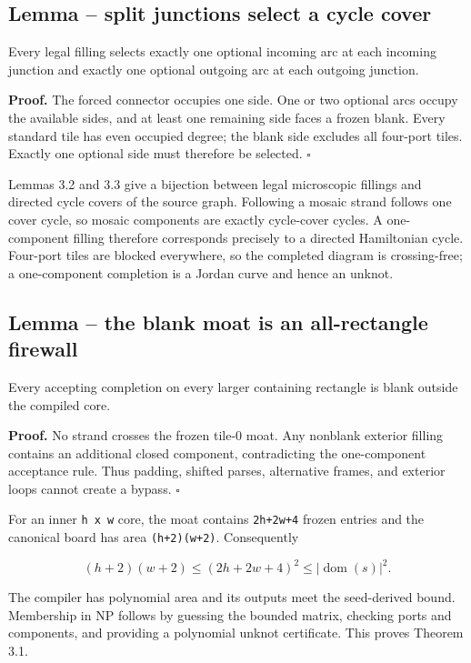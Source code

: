 \documentclass[11pt]{article}
\begin{document}
\subsection{Lemma -- split junctions select a cycle cover}

Every legal filling selects exactly one optional incoming arc at each incoming
junction and exactly one optional outgoing arc at each outgoing junction.

\textbf{Proof.}  The forced connector occupies one side.  One or two optional arcs
occupy the available sides, and at least one remaining side faces a frozen
blank.  Every standard tile has even occupied degree; the blank side excludes
all four-port tiles.  Exactly one optional side must therefore be selected. \hfill$\square$

Lemmas 3.2 and 3.3 give a bijection between legal microscopic fillings and
directed cycle covers of the source graph.  Following a mosaic strand follows
one cover cycle, so mosaic components are exactly cycle-cover cycles.  A
one-component filling therefore corresponds precisely to a directed
Hamiltonian cycle.  Four-port tiles are blocked everywhere, so the completed
diagram is crossing-free; a one-component completion is a Jordan curve and
hence an unknot.

\subsection{Lemma -- the blank moat is an all-rectangle firewall}

Every accepting completion on every larger containing rectangle is blank
outside the compiled core.

\textbf{Proof.}  No strand crosses the frozen tile-0 moat.  Any nonblank exterior
filling contains an additional closed component, contradicting the
one-component acceptance rule.  Thus padding, shifted parses, alternative
frames, and exterior loops cannot create a bypass. \hfill$\square$

For an inner \texttt{h x w} core, the moat contains \texttt{2h+2w+4} frozen entries and the
canonical board has area \texttt{(h+2)(w+2)}.  Consequently

\[
 (h+2)(w+2)\leq (2h+2w+4)^2\leq |\operatorname{dom}(s)|^2.
\]

The compiler has polynomial area and its outputs meet the seed-derived bound.
Membership in NP follows by guessing the bounded matrix, checking ports and
components, and providing a polynomial unknot certificate.  This proves
Theorem 3.1.
\end{document}
